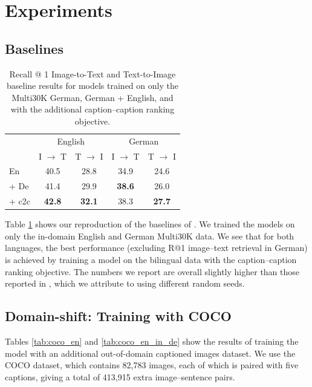 \section{Experiments}


\subsection{Baselines}
\begin{table}[t]
    \centering
    \renewcommand{\arraystretch}{1.0}
    \begin{tabular}{lcccc}
        \toprule
         & \multicolumn{2}{c}{English} & \multicolumn{2}{c}{German} \\
         & I $\rightarrow$ T & T $\rightarrow$ I & I $\rightarrow$ T & T $\rightarrow$ I\\
         \midrule
         En & 40.5  &  28.8 & 34.9 & 24.6  \\
         \; + De & 41.4 & 29.9  & \textbf{38.6} & 26.0\\
         \; \; + c2c & \textbf{42.8} & \textbf{32.1} & 38.3 & \textbf{27.7} \\
         \bottomrule
    \end{tabular}
    
    \caption{Recall @ 1 Image-to-Text and Text-to-Image baseline results for models trained on only the Multi30K German, German + English, and with the additional caption--caption ranking objective.}\label{tab:baseline}
\end{table}

Table \ref{tab:baseline} shows our reproduction of the baselines of \citet{kadar2018conll}. We trained the models on only the in-domain English and German Multi30K data. We see that for both languages, the best performance (excluding R@1 image--text retrieval in German) is achieved by training a model on the bilingual data with the caption--caption ranking objective. The numbers we report are overall slightly higher than those reported in \citet{kadar2018conll}, which we attribute to using different random seeds. 


\subsection{Domain-shift: Training with COCO}

Tables \ref{tab:coco_en} and \ref{tab:coco_en_in_de} show the results of training the model with an additional out-of-domain captioned images dataset. We use the COCO dataset, which contains 82,783 images, each of which is paired with five captions, giving a total of 413,915 extra image--sentence pairs. 

